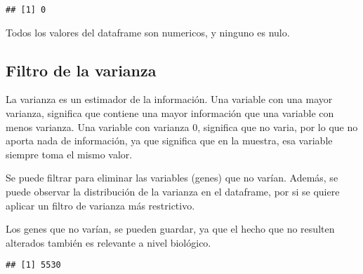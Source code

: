 \documentclass[
]{article}
\newenvironment{Shaded}{\begin{snugshade}}{\end{snugshade}}
\newcommand{\AttributeTok}[1]{\textcolor[rgb]{0.77,0.63,0.00}{#1}}
\newcommand{\CommentTok}[1]{\textcolor[rgb]{0.56,0.35,0.01}{\textit{#1}}}
\newcommand{\DecValTok}[1]{\textcolor[rgb]{0.00,0.00,0.81}{#1}}
\newcommand{\FunctionTok}[1]{\textcolor[rgb]{0.00,0.00,0.00}{#1}}
\newcommand{\NormalTok}[1]{#1}
\newcommand{\OtherTok}[1]{\textcolor[rgb]{0.56,0.35,0.01}{#1}}
\newcommand{\SpecialCharTok}[1]{\textcolor[rgb]{0.00,0.00,0.00}{#1}}
\begin{document}
\begin{verbatim}
## [1] 0
\end{verbatim}

Todos los valores del dataframe son numericos, y ninguno es nulo.

\hypertarget{filtro-de-la-varianza}{%
\subsection{Filtro de la varianza}\label{filtro-de-la-varianza}}

La varianza es un estimador de la información. Una variable con una
mayor varianza, significa que contiene una mayor información que una
variable con menos varianza. Una variable con varianza 0, significa que
no varia, por lo que no aporta nada de información, ya que significa que
en la muestra, esa variable siempre toma el mismo valor.

Se puede filtrar para eliminar las variables (genes) que no varían.
Además, se puede observar la distribución de la varianza en el
dataframe, por si se quiere aplicar un filtro de varianza más
restrictivo.

Los genes que no varían, se pueden guardar, ya que el hecho que no
resulten alterados también es relevante a nivel biológico.

\begin{Shaded}
\end{Shaded}

\begin{verbatim}
## [1] 5530
\end{verbatim}
\end{document}

